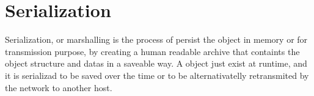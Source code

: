 \section{Serialization 
}
Serialization, or marshalling is the process of persist the object in memory 
or for transmission purpose, by creating a human readable 
archive that containts the object structure and datas 
in a saveable way. A object just exist at runtime, and 
it is serializad to be saved over the time or 
to be alternativatelly retransmited by the network 
to another host.